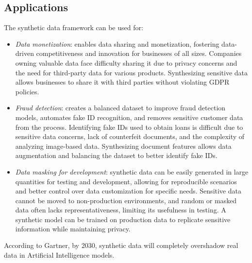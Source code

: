 \subsection{Applications}
The synthetic data framework can be used for: 
\begin{itemize}
    \item \textit{Data monetization}: enables data sharing and monetization, fostering data-driven competitiveness and innovation for businesses of all sizes.
        Companies owning valuable data face difficulty sharing it due to privacy concerns and the need for third-party data for various products.
        Synthesizing sensitive data allows businesses to share it with third parties without violating GDPR policies.
    \item \textit{Fraud detection}: creates a balanced dataset to improve fraud detection models, automates fake ID recognition, and removes sensitive customer data from the process.
        Identifying fake IDs used to obtain loans is difficult due to sensitive data concerns, lack of counterfeit documents, and the complexity of analyzing image-based data.
        Synthesizing document features allows data augmentation and balancing the dataset to better identify fake IDs.
    \item \textit{Data masking for development}: synthetic data can be easily generated in large quantities for testing and development, allowing for reproducible scenarios and better control over data customization for specific needs.
        Sensitive data cannot be moved to non-production environments, and random or masked data often lacks representativeness, limiting its usefulness in testing.
        A synthetic model can be trained on production data to replicate sensitive information while maintaining privacy.
\end{itemize}
\noindent According to Gartner, by 2030, synthetic data will completely overshadow real data in Artificial Intelligence models.

